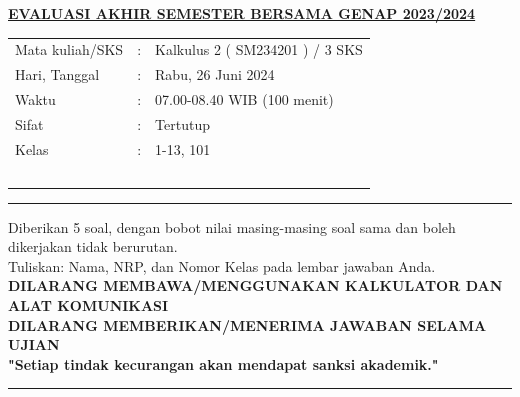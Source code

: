 \documentclass[10pt,openany,a4paper]{article}
\theoremstyle{definition}
\theoremstyle{definition}
\theoremstyle{plain}
\begin{document}
    \begin{center}
	{\underline{\textbf{\MakeUppercase{EVALUASI AKHIR SEMESTER BERSAMA GENAP 2023/2024}}}}
    \end{center}

    \begin{center}
	\begin{tabular}{lcl}
		Mata kuliah/SKS & : & Kalkulus 2 ( SM234201 ) / 3 SKS\\
		Hari, Tanggal & : & Rabu, 26 Juni 2024\\
		Waktu & : & 07.00-08.40 WIB (100 menit)\\
		Sifat & : & Tertutup\\
		Kelas & : & 1-13, 101\\
  ~
	\end{tabular}

    
    \noindent\rule{\textwidth}{2.pt}
    \noindent Diberikan 5 soal, dengan bobot nilai masing-masing soal sama dan boleh dikerjakan tidak berurutan.\\
    Tuliskan: Nama, NRP, dan Nomor Kelas pada lembar jawaban Anda.\\
    \textbf{\MakeUppercase{dilarang membawa/menggunakan kalkulator dan alat komunikasi}}\\
    {\textbf{\MakeUppercase{dilarang memberikan/menerima jawaban selama ujian}}}\\
    {\textbf{"Setiap tindak kecurangan akan mendapat sanksi akademik."}}

	
    \noindent\rule{\textwidth}{2.pt}
        \end{center}
\end{document}
